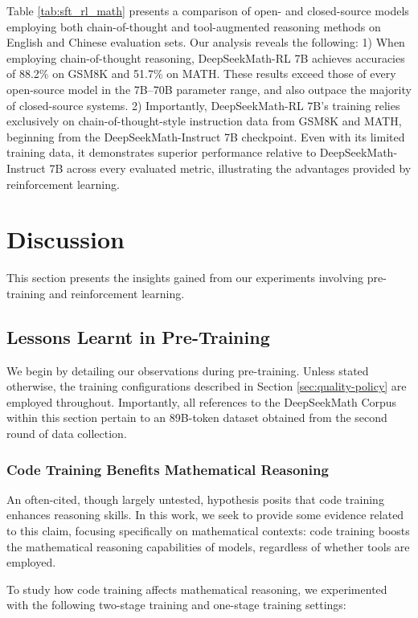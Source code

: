 \begin{itemize}[topsep=0pt]
\begin{itemize}[topsep=0pt]
Table \ref{tab:sft_rl_math} presents a comparison of open- and closed-source models employing both chain-of-thought and tool-augmented reasoning methods on English and Chinese evaluation sets. Our analysis reveals the following: 1) When employing chain-of-thought reasoning, DeepSeekMath-RL 7B achieves accuracies of 88.2\% on GSM8K and 51.7\% on MATH. These results exceed those of every open-source model in the 7B–70B parameter range, and also outpace the majority of closed-source systems. 2) Importantly, DeepSeekMath-RL 7B’s training relies exclusively on chain-of-thought-style instruction data from GSM8K and MATH, beginning from the DeepSeekMath-Instruct 7B checkpoint. Even with its limited training data, it demonstrates superior performance relative to DeepSeekMath-Instruct 7B across every evaluated metric, illustrating the advantages provided by reinforcement learning.

\section{Discussion}
This section presents the insights gained from our experiments involving pre-training and reinforcement learning.

\subsection{Lessons Learnt in Pre-Training}

We begin by detailing our observations during pre-training. Unless stated otherwise, the training configurations described in Section \ref{sec:quality-policy} are employed throughout. Importantly, all references to the DeepSeekMath Corpus within this section pertain to an 89B-token dataset obtained from the second round of data collection.

\subsubsection{Code Training Benefits Mathematical Reasoning}

An often-cited, though largely untested, hypothesis posits that code training enhances reasoning skills. In this work, we seek to provide some evidence related to this claim, focusing specifically on mathematical contexts: code training boosts the mathematical reasoning capabilities of models, regardless of whether tools are employed.

To study how code training affects mathematical reasoning, we experimented with the following two-stage training and one-stage training settings:


\end{itemize}
\end{itemize}
